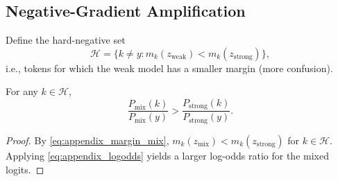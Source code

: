 \subsection{Negative-Gradient Amplification}
\begin{definition}
Define the hard-negative set
\begin{equation}
    \mathcal{H} = \{ k \neq y : m_k(z_{\mathrm{weak}}) < m_k(z_{\mathrm{strong}}) \},
    \label{eq:appendix_hard_set}
\end{equation}
i.e., tokens for which the weak model has a smaller margin (more confusion).
\end{definition}

\begin{lemma}
For any $k \in \mathcal{H}$,
\begin{equation}
    \frac{P_{\mathrm{mix}}(k)}{P_{\mathrm{mix}}(y)}
    >
    \frac{P_{\mathrm{strong}}(k)}{P_{\mathrm{strong}}(y)}.
    \label{eq:appendix_rel_prob_increase}
\end{equation}
\end{lemma}
\begin{proof}
By \eqref{eq:appendix_margin_mix}, $m_k(z_{\text{mix}}) < m_k(z_{\mathrm{strong}})$ for $k \in \mathcal{H}$.
Applying \eqref{eq:appendix_logodds} yields a larger log-odds ratio for the mixed logits.
\end{proof}

